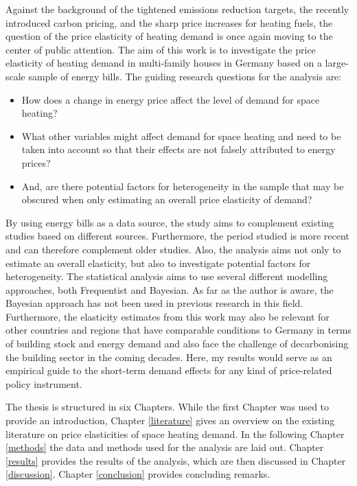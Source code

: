 \documentclass[12pt,twoside]{reedthesis}
\providecommand{\tightlist}{%
  \setlength{\itemsep}{0pt}\setlength{\parskip}{0pt}}
\begin{document}
Against the background of the tightened emissions reduction targets, the recently introduced carbon pricing, and the sharp price increases for heating fuels, the question of the price elasticity of heating demand is once again moving to the center of public attention. The aim of this work is to investigate the price elasticity of heating demand in multi-family houses in Germany based on a large-scale sample of energy bills. The guiding research questions for the analysis are:
\begin{itemize}
\tightlist
\item
  How does a change in energy price affect the level of demand for space heating?
\item
  What other variables might affect demand for space heating and need to be taken into account so that their effects are not falsely attributed to energy prices?
\item
  And, are there potential factors for heterogeneity in the sample that may be obscured when only estimating an overall price elasticity of demand?
\end{itemize}
By using energy bills as a data source, the study aims to complement existing studies based on different sources. Furthermore, the period studied is more recent and can therefore complement older studies. Also, the analysis aims not only to estimate an overall elasticity, but also to investigate potential factors for heterogeneity. The statistical analysis aims to use several different modelling approaches, both Frequentist and Bayesian. As far as the author is aware, the Bayesian approach has not been used in previous research in this field. Furthermore, the elasticity estimates from this work may also be relevant for other countries and regions that have comparable conditions to Germany in terms of building stock and energy demand and also face the challenge of decarbonising the building sector in the coming decades. Here, my results would serve as an empirical guide to the short-term demand effects for any kind of price-related policy instrument.

The thesis is structured in six Chapters. While the first Chapter was used to provide an introduction, Chapter \ref{literature} gives an overview on the existing literature on price elasticities of space heating demand. In the following Chapter \ref{methods} the data and methods used for the analysis are laid out. Chapter \ref{results} provides the results of the analysis, which are then discussed in Chapter \ref{discussion}. Chapter \ref{conclusion} provides concluding remarks.
\end{document}
